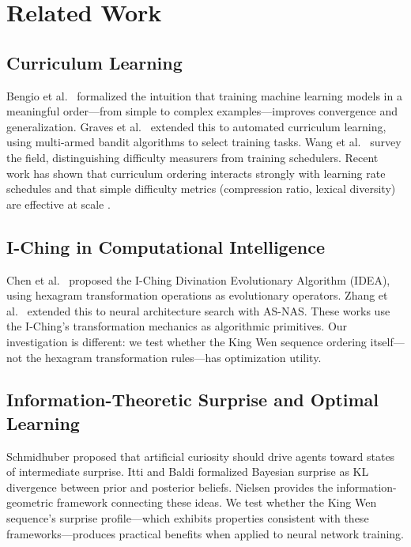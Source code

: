 \documentclass{article}
\begin{document}
\section{Related Work}\label{sec:related}

\subsection{Curriculum Learning}

Bengio et al.\ \cite{bengio2009curriculum} formalized the intuition that training machine learning models in a meaningful order---from simple to complex examples---improves convergence and generalization. Graves et al.\ \cite{graves2017automated} extended this to automated curriculum learning, using multi-armed bandit algorithms to select training tasks. Wang et al.\ \cite{wang2021curriculum} survey the field, distinguishing difficulty measurers from training schedulers. Recent work has shown that curriculum ordering interacts strongly with learning rate schedules \cite{agarwal2025lrdecay} and that simple difficulty metrics (compression ratio, lexical diversity) are effective at scale \cite{jia2025curriculum}.

\subsection{I-Ching in Computational Intelligence}

Chen et al.\ \cite{chen2016iching} proposed the I-Ching Divination Evolutionary Algorithm (IDEA), using hexagram transformation operations as evolutionary operators. Zhang et al.\ \cite{zhang2021asnas} extended this to neural architecture search with AS-NAS. These works use the I-Ching's transformation mechanics as algorithmic primitives. Our investigation is different: we test whether the King Wen sequence ordering itself---not the hexagram transformation rules---has optimization utility.

\subsection{Information-Theoretic Surprise and Optimal Learning}

Schmidhuber \cite{schmidhuber2006developmental} proposed that artificial curiosity should drive agents toward states of intermediate surprise. Itti and Baldi \cite{itti2009bayesian} formalized Bayesian surprise as KL divergence between prior and posterior beliefs. Nielsen \cite{Nielsen_2020} provides the information-geometric framework connecting these ideas. We test whether the King Wen sequence's surprise profile---which exhibits properties consistent with these frameworks---produces practical benefits when applied to neural network training.
\end{document}
